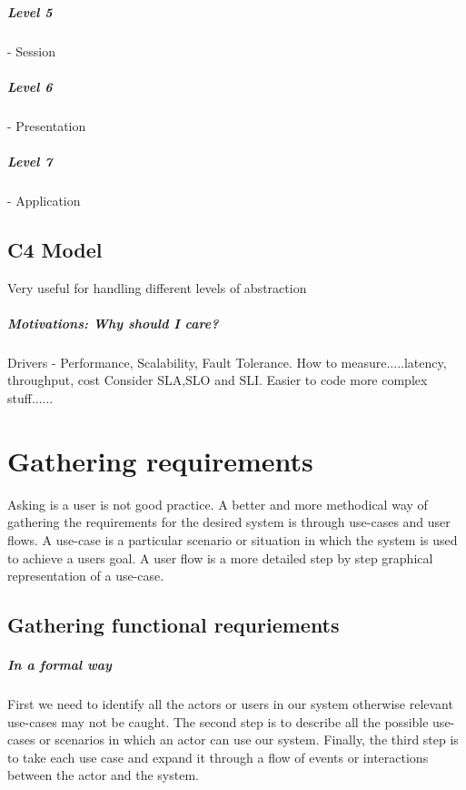 \documentclass[a4paper, 11pt]{book}
\begin{document}
    \paragraph{Level 5} - Session

    \paragraph{Level 6} - Presentation

    \paragraph{Level 7} - Application


    \section{C4 Model}
    Very useful for handling different levels of abstraction

    \paragraph{Motivations: Why should I care?}
    Drivers - Performance, Scalability, Fault Tolerance.
    How to measure.....latency, throughput, cost
    Consider SLA,SLO and SLI.
    Easier to code more complex stuff......


    \chapter{Gathering requirements}
    Asking is a user is not good practice.
    A better and more methodical way of gathering the requirements for the desired system is through use-cases and user flows.
    A use-case is a particular scenario or situation in which the system is used to achieve a users goal.
    A user flow is a more detailed step by step graphical representation of a use-case.


    \section{Gathering functional requriements}

    \paragraph{In a formal way}

    First we need to identify all the actors or users in our system otherwise relevant use-cases may not be caught.
    The second step is to describe all the possible use-cases or scenarios in which an actor can use our system.
    Finally, the third step is to take each use case and expand it through a flow of events or interactions between the actor and the system.
\end{document}
